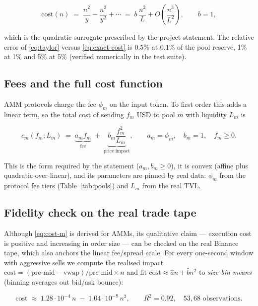 \documentclass[11pt,a4paper]{article}
\theoremstyle{remark}
\begin{document}
\begin{equation}
\label{eq:taylor}
  \text{cost}(n) \;=\; \frac{n^{2}}{y} - \frac{n^{3}}{y^{2}} + \cdots
  \;=\; b\,\frac{n^{2}}{L} + O\!\left(\frac{n^{3}}{L^{2}}\right),
  \qquad b = 1,
\end{equation}

which is the quadratic surrogate prescribed by the project statement.  The relative error of
\eqref{eq:taylor} versus \eqref{eq:exact-cost} is 0.5\% at $0.1\%$ of the pool reserve, 1\%
at 1\% and 5\% at 5\% (verified numerically in the test suite).

\subsection{Fees and the full cost function}

AMM protocols charge the fee $\phi_m$ on the input token.  To first order this adds a linear
term, so the total cost of sending $f_m$ USD to pool $m$ with liquidity $L_m$ is

\begin{equation}
\label{eq:cost-m}
  c_m(f_m; L_m) \;=\; \underbrace{a_m f_m}_{\text{fee}}
  \;+\; \underbrace{b_m \frac{f_m^{2}}{L_m}}_{\text{price impact}},
  \qquad a_m = \phi_m,\quad b_m = 1,\quad f_m \ge 0.
\end{equation}

This is the form required by the statement ($a_m,b_m\ge 0$), it is convex (affine plus
quadratic-over-linear), and its parameters are pinned by real data: $\phi_m$ from the
protocol fee tiers (Table~\ref{tab:pools}) and $L_m$ from the real TVL.

\subsection{Fidelity check on the real trade tape}
\label{sec:tape}

Although \eqref{eq:cost-m} is derived for AMMs, its qualitative claim --- execution cost is
positive and increasing in order size --- can be checked on the real Binance tape, which also
anchors the linear fee/spread scale.  For every one-second window with aggressive sells we
compute the realised impact
$\text{cost} = (\text{pre-mid}-\text{vwap})/\text{pre-mid}\times n$ and fit
$\text{cost}\approx \hat a n + \hat b n^{2}$ to \emph{size-bin means} (binning averages out
bid/ask bounce):

\[
  \text{cost} \;\approx\; 1.28\cdot 10^{-4}\, n \;-\; 1.04\cdot 10^{-9}\, n^{2},
  \qquad R^{2} = 0.92,\quad 53{,}68 \text{ observations}.
\]
\end{document}
